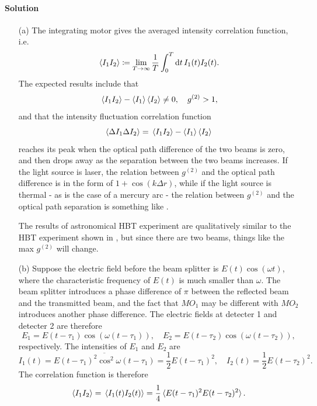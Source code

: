 \documentclass[hyperref, a4paper]{article}
\begin{document}
\paragraph{Solution} \begin{itemize}
    \item[(a)] The integrating motor gives the averaged intensity correlation function, i.e.
    \begin{equation}
        \expval*{I_1 I_2} \coloneqq \lim_{T \to \infty} \frac{1}{T} \int_0^T \dd{t} I_1(t) I_2(t). 
    \end{equation} 
    The expected results include that
    \begin{equation}
        \expval*{I_1 I_2} - \expval{I_1} \expval{I_2} \neq 0, \quad g^{(2)} > 1,
    \end{equation} 
    and that the intensity fluctuation correlation function 
    \begin{equation}
        \expval{\Delta I_1 \Delta I_2} = \expval*{I_1 I_2} - \expval{I_1} \expval{I_2}
    \end{equation}
    reaches its peak when the optical path difference of the two beams is zero, and then drops away as the separation between the two beams increases. 
    If the light source is laser, the relation between $g^{(2)}$ and the optical path difference is in the form of $1 + \cos(k \Delta r)$, while if the light source is thermal - as is the case of a mercury arc - the relation between $g^{(2)}$ and the optical path separation is something like .

    The results of astronomical HBT experiment are qualitatively similar to the HBT experiment shown in , but since there are two beams, things like the max $g^{(2)}$ will change.

    \item[(b)] Suppose the electric field before the beam splitter is $E(t) \cos(\omega t)$, where the characteristic frequency of $E(t)$ is much smaller than $\omega$.
    The beam splitter introduces a phase difference of $\pi$ between the reflected beam and the transmitted beam, and the fact that $MO_1$ may be different with $MO_2$ introduces another phase difference.
    The electric fields at detecter 1 and detecter 2 are therefore 
    \begin{equation}
        E_1 = E(t - \tau_1) \cos(\omega (t - \tau_1)), \quad E_2 = E(t - \tau_2) \cos(\omega (t - \tau_2)),
    \end{equation}
    respectively.
    The intensities of $E_1$ and $E_2$ are 
    \begin{equation}
        I_1(t) = \overline{E(t - \tau_1)^2 \cos^2 \omega(t - \tau_1)} = \frac{1}{2} E(t - \tau_1)^2, \quad I_2(t) = \frac{1}{2} E(t - \tau_2)^2.
    \end{equation}
    The correlation function is therefore 
    \begin{equation}
        \expval{I_1 I_2} = \expval*{ I_1(t) I_2(t) } = \frac{1}{4} \expval*{E(t - \tau_1)^2 E(t - \tau_2)^2}.
    \end{equation}
    

\end{itemize}
\end{document}
